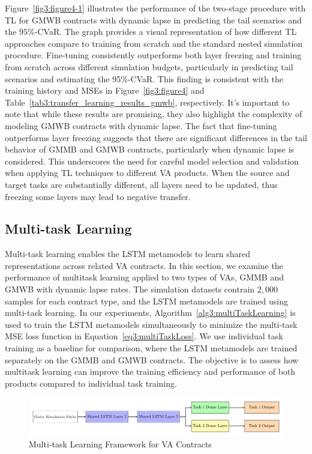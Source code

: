 Figure~\ref{fig3:figure4-1} illustrates the performance of the two-stage procedure with TL for GMWB contracts with dynamic lapse in predicting the tail scenarios and the $95\%$-CVaR.
The graph provides a visual representation of how different TL approaches compare to training from scratch and the standard nested simulation procedure.
Fine-tuning consistently outperforms both layer freezing and training from scratch across different simulation budgets, particularly in predicting tail scenarios and estimating the 95\%-CVaR. 
This finding is consistent with the training history and MSEs in Figure~\ref{fig3:figure4} and Table~\ref{tab3:transfer_learning_results_gmwb}, respectively.
It's important to note that while these results are promising, they also highlight the complexity of modeling GMWB contracts with dynamic lapse. 
The fact that fine-tuning outperforms layer freezing suggests that there are significant differences in the tail behavior of GMMB and GMWB contracts, particularly when dynamic lapse is considered. 
This underscores the need for careful model selection and validation when applying TL techniques to different VA products.
When the source and target tasks are substantially different, all layers need to be updated, thus freezing some layers may lead to negative transfer.

\subsection{Multi-task Learning}

Multi-task learning enables the LSTM metamodels to learn shared representations across related VA contracts.
In this section, we examine the performance of multitask learning applied to two types of VAs, GMMB and GMWB with dynamic lapse rates.
The simulation datasets contrain $2,\!000$ samples for each contract type, and the LSTM metamodels are trained using multi-task learning. 
In our experiments, Algorithm~\ref{alg3:multiTaskLearning} is used to train the LSTM metamodels simultaneously to minimize the multi-task MSE loss function in Equation~\ref{eq3:multiTaskLoss}.
We use individual task training as a baseline for comparison, where the LSTM metamodels are trained separately on the GMMB and GMWB contracts.
The objective is to assess how multitask learning can improve the training efficiency and performance of both products compared to individual task training.

\begin{figure}[ht!]
    \includegraphics[width=\textwidth]{./project3/tikz/mtl.pdf}
    \caption{Multi-task Learning Framework for VA Contracts}
    \label{fig3:mtl}
\end{figure}

